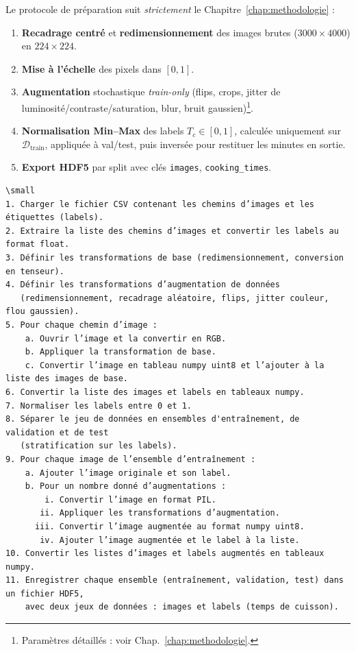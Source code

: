 Le protocole de préparation suit \textit{strictement} le Chapitre~\ref{chap:methodologie} :
\begin{enumerate}
	\item \textbf{Recadrage centré} et \textbf{redimensionnement} des images brutes (\(3000\times4000\)) en \(224\times224\).
	\item \textbf{Mise à l’échelle} des pixels dans \([0,1]\).
	\item \textbf{Augmentation} stochastique \textit{train-only} (flips, crops, jitter de luminosité/contraste/saturation, blur, bruit gaussien)\footnote{Paramètres détaillés : voir Chap.~\ref{chap:methodologie}.}.
	\item \textbf{Normalisation Min--Max} des labels \(T_c\in[0,1]\), calculée uniquement sur \(\mathcal{D}_{\text{train}}\), appliquée à val/test, puis inversée pour restituer les minutes en sortie.
	\item \textbf{Export HDF5} par split avec clés \texttt{images}, \texttt{cooking\_times}.
\end{enumerate}


\begin{verbatim}
\small
1. Charger le fichier CSV contenant les chemins d’images et les étiquettes (labels).
2. Extraire la liste des chemins d’images et convertir les labels au format float.
3. Définir les transformations de base (redimensionnement, conversion en tenseur).
4. Définir les transformations d’augmentation de données 
   (redimensionnement, recadrage aléatoire, flips, jitter couleur, flou gaussien).
5. Pour chaque chemin d’image :
    a. Ouvrir l’image et la convertir en RGB.
    b. Appliquer la transformation de base.
    c. Convertir l’image en tableau numpy uint8 et l’ajouter à la liste des images de base.
6. Convertir la liste des images et labels en tableaux numpy.
7. Normaliser les labels entre 0 et 1.
8. Séparer le jeu de données en ensembles d'entraînement, de validation et de test 
   (stratification sur les labels).
9. Pour chaque image de l’ensemble d’entraînement :
    a. Ajouter l’image originale et son label.
    b. Pour un nombre donné d’augmentations :
        i. Convertir l’image en format PIL.
       ii. Appliquer les transformations d’augmentation.
      iii. Convertir l’image augmentée au format numpy uint8.
       iv. Ajouter l’image augmentée et le label à la liste.
10. Convertir les listes d’images et labels augmentés en tableaux numpy.
11. Enregistrer chaque ensemble (entraînement, validation, test) dans un fichier HDF5, 
    avec deux jeux de données : images et labels (temps de cuisson).
\end{verbatim}

